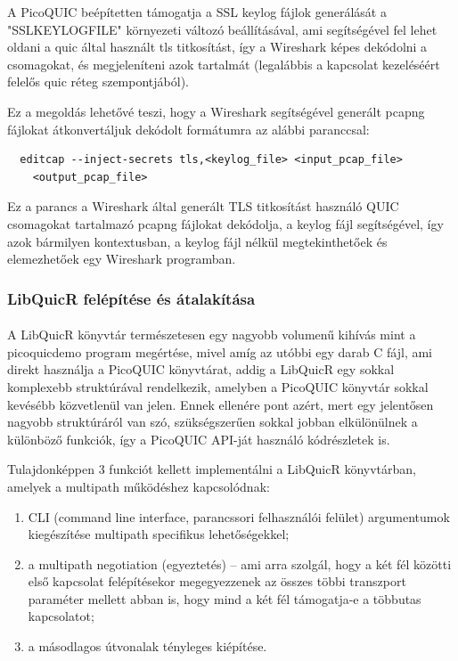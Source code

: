 \documentclass[a4paper,oneside]{article}
\begin{document}
A PicoQUIC beépítetten támogatja a SSL keylog fájlok generálását a "SSLKEYLOGFILE" környezeti változó 
beállításával, ami segítségével fel lehet oldani a quic által használt tls titkosítást,
így a Wireshark képes dekódolni a csomagokat, és megjeleníteni azok 
tartalmát (legalábbis a kapcsolat kezeléséért felelős quic réteg szempontjából).

Ez a megoldás lehetővé teszi, hogy a Wireshark segítségével generált 
pcapng fájlokat átkonvertáljuk dekódolt formátumra az alábbi paranccsal:
\begin{verbatim}
  editcap --inject-secrets tls,<keylog_file> <input_pcap_file> 
    <output_pcap_file>
\end{verbatim}
Ez a parancs a Wireshark által generált TLS titkosítást használó QUIC 
csomagokat tartalmazó pcapng fájlokat dekódolja, a keylog fájl segítségével, így azok bármilyen kontextusban, a keylog fájl nélkül megtekinthetőek
és elemezhetőek egy Wireshark programban.


\subsubsection{LibQuicR felépítése és átalakítása}
\paragraph{}

A LibQuicR könyvtár természetesen egy nagyobb volumenű kihívás mint a picoquicdemo program 
megértése, mivel amíg az utóbbi egy darab C fájl, ami direkt használja a PicoQUIC könyvtárat,
addig a LibQuicR egy sokkal komplexebb struktúrával rendelkezik, amelyben a PicoQUIC könyvtár sokkal kevésébb közvetlenül van jelen.
Ennek ellenére pont azért, mert egy jelentősen nagyobb struktúráról van szó, szükségszerűen sokkal 
jobban elkülönülnek a különböző funkciók, így a PicoQUIC API-ját használó kódrészletek is.

Tulajdonképpen 3 funkciót kellett implementálni a LibQuicR könyvtárban,
amelyek a multipath működéshez kapcsolódnak:
\begin{enumerate}
  \item CLI (command line interface, parancssori felhasználói felület) argumentumok kiegészítése multipath specifikus lehetőségekkel;

  \item a multipath negotiation (egyeztetés) – ami arra szolgál, hogy a két fél közötti első
  kapcsolat felépítésekor megegyezzenek az összes többi transzport paraméter mellett abban is, 
  hogy mind a két fél támogatja-e a többutas kapcsolatot;

  \item a másodlagos útvonalak tényleges kiépítése.

\end{enumerate}
\end{document}
